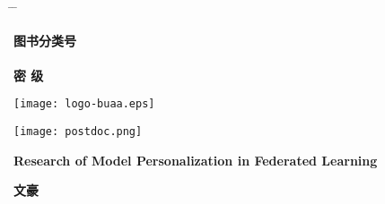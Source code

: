 \thispagestyle{empty}\setcounter{page}{0}

\begin{tabbing}
 \hspace*{0cm} \= \hspace{2.7cm} \= \kill

\underline{\hspace{0.85cm}{\sihao 10006}\hspace{0.85cm}}  \hskip4.1cm
  {\sihao\textbf{图书分类号}}\underline{\hspace{0.6cm}{\sihao O413}\hspace{0.6cm}}\\ %
  \\
\underline{\hspace{0.4cm}{\sihao B18066}\hspace{0.7cm}}  \hskip4.1cm
  {\sihao\textbf{密\hskip16.6mm 级}}\underline{\hspace{2.4cm}}
\end{tabbing}

\vspace{1.2cm}

\begin{center}
 \texttt{[image: logo-buaa.eps]}
\end{center}

\vspace{0.15cm}

\begin{center}
\texttt{[image: postdoc.png]}
\end{center}

\vspace{0.15cm}

\begin{center}{\erhao{}}
\end{center}

\vspace{0.05cm}

\begin{center}{\erhao\bf
Research of Model Personalization in Federated Learning}\end{center}

\vspace{0.05cm}

\begin{center}{\xiaoerhao\song\boldmath\bf 文豪}\end{center}

